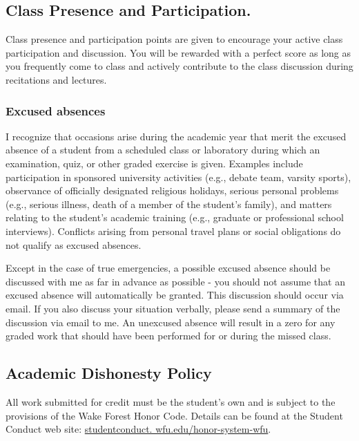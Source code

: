 \documentclass[11pt,]{article}
\begin{document}
\subsection{Class Presence and
Participation.}\label{class-presence-and-participation.}

Class presence and participation points are given to encourage your
active class participation and discussion. You will be rewarded with a
perfect score as long as you frequently come to class and actively
contribute to the class discussion during recitations and lectures.

\subsubsection{Excused absences}\label{excused-absences}

I recognize that occasions arise during the academic year that merit the
excused absence of a student from a scheduled class or laboratory during
which an examination, quiz, or other graded exercise is given. Examples
include participation in sponsored university activities (e.g., debate
team, varsity sports), observance of officially designated religious
holidays, serious personal problems (e.g., serious illness, death of a
member of the student's family), and matters relating to the student's
academic training (e.g., graduate or professional school interviews).
Conflicts arising from personal travel plans or social obligations do
not qualify as excused absences.

Except in the case of true emergencies, a possible excused absence
should be discussed with me as far in advance as possible - you should
not assume that an excused absence will automatically be granted. This
discussion should occur via email. If you also discuss your situation
verbally, please send a summary of the discussion via email to me. An
unexcused absence will result in a zero for any graded work that should
have been performed for or during the missed class.

\subsection{Academic Dishonesty
Policy}\label{academic-dishonesty-policy}

All work submitted for credit must be the student's own and is subject
to the provisions of the Wake Forest Honor Code. Details can be found at
the Student Conduct web site:
\href{https://studentconduct.wfu.edu/honor-system-wfu/}{studentconduct.
wfu.edu/honor-system-wfu}.
\end{document}
